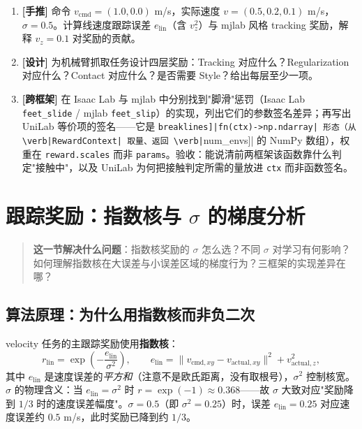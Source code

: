 \begin{practice}[练习·四层分解]
\begin{enumerate}
  \item \textbf{[手推]} 命令 $v_{\text{cmd}}=(1.0,0.0)$ m/s，实际速度 $v=(0.5,0.2,0.1)$ m/s，$\sigma=0.5$。计算线速度跟踪误差 $e_{\text{lin}}$（含 $v_z^2$）与 mjlab 风格 tracking 奖励，解释 $v_z=0.1$ 对奖励的贡献。
  \item \textbf{[设计]} 为机械臂抓取任务设计四层奖励：Tracking 对应什么？Regularization 对应什么？Contact 对应什么？是否需要 Style？给出每层至少一项。
  \item \textbf{[跨框架]} 在 Isaac Lab 与 mjlab 中分别找到"脚滑"惩罚（Isaac Lab \verb|feet_slide| / mjlab \verb|feet_slip|）的实现，列出它们的参数签名差异；再写出 UniLab 等价项的签名——它是 \Verb[breaklines]|fn(ctx)->np.ndarray| 形态（从 \verb|RewardContext| 取量、返回 \verb|[num_envs]| 的 NumPy 数组），权重在 \verb|reward.scales| 而非 \verb|params|。验收：能说清前两框架该函数靠什么判定"接触中"，以及 UniLab 为何把接触判定所需的量放进 \verb|ctx| 而非函数签名。
\end{enumerate}
\end{practice}

\section{\texorpdfstring{跟踪奖励：指数核与 $\sigma$ 的梯度分析}{跟踪奖励：指数核与 sigma 的梯度分析}}
\label{sec:rlmc-rew-track}

\begin{quote}\small
\textbf{这一节解决什么问题}：指数核奖励的 $\sigma$ 怎么选？不同 $\sigma$ 对学习有何影响？如何理解指数核在大误差与小误差区域的梯度行为？三框架的实现差异在哪？
\end{quote}

\subsection{算法原理：为什么用指数核而非负二次}
\label{sec:rlmc-rew-expkernel}

velocity 任务的主跟踪奖励使用\textbf{指数核}：
\begin{equation}
r_{\text{lin}}=\exp\!\left(-\frac{e_{\text{lin}}}{\sigma^2}\right),\qquad
e_{\text{lin}}=\lVert v_{\text{cmd},xy}-v_{\text{actual},xy}\rVert^2+v_{\text{actual},z}^2,
\label{eq:rlmc-rew-explin}
\end{equation}
其中 $e_{\text{lin}}$ 是速度误差的\emph{平方和}（注意不是欧氏距离，没有取根号），$\sigma^2$ 控制核宽。$\sigma$ 的物理含义：当 $e_{\text{lin}}=\sigma^2$ 时 $r=\exp(-1)\approx0.368$——故 $\sigma$ 大致对应"奖励降到 $1/3$ 时的速度误差幅度"。$\sigma=0.5$（即 $\sigma^2=0.25$）时，误差 $e_{\text{lin}}=0.25$ 对应速度误差约 $0.5$ m/s，此时奖励已降到约 $1/3$。

